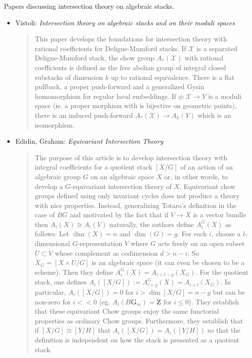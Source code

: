 \noindent
Papers discussing intersection theory on algebraic stacks.
\begin{itemize}
\item
Vistoli: \emph{Intersection theory on algebraic stacks and on their moduli
spaces} \cite{vistoli_intersection}
\begin{quote}
This paper develops the foundations for intersection theory with rational
coefficients for Deligne-Mumford stacks. If $\mathcal{X}$ is a separated
Deligne-Mumford stack, the chow group $A_*(\mathcal{X})$ with rational
coefficients is
defined as the free abelian group of integral closed substacks of dimension $k$
up to rational equivalence. There is a flat pullback, a proper push-forward
and a generalized Gysin homomorphism for regular local embeddings. If
$\phi : \mathcal{X} \to Y$ is a moduli space (ie. a proper morphism with
is bijective on
geometric points), there is an induced push-forward $A_*(\mathcal{X}) \to
A_k(Y)$
which is an isomorphism.
\end{quote}
\item Edidin, Graham: \emph{Equivariant Intersection Theory}
\cite{edidin-graham}
\begin{quote}
The purpose of this article is to develop intersection theory with integral
coefficients for a quotient stack $[X/G]$ of an action of an algebraic group
$G$ on an algebraic space $X$ or, in other words, to develop a $G$-equivariant
intersection theory of $X$. Equivariant chow groups defined using only
invariant cycles does not produce a theory with nice properties. Instead,
generalizing Totaro's definition in the case of $BG$ and motivated by the fact
that if $V \to X$ is a vector bundle then $A_i(X) \cong A_i(V)$ naturally, the
authors define $A_i^G(X)$ as follows:
Let $\dim(X) = n$ and $\dim(G) = g$. For each $i$, choose a $l$-dimensional
$G$-representation $V$ where $G$ acts freely on an open subset $U \subset V$
whose complement as codimension $d > n-i$. So $X_G= [X \times U / G]$ is an
algebraic space (it can even be chosen to be a scheme). Then they define
$A_i^G(X) = A_{i+l-g}(X_G)$. For the quotient stack, one defines $A_i( [X/G])
:= A_{i+g}^G(X) = A_{i+l}(X_G)$. In particular, $A_i([X/G]) = 0$ for $i > \dim
[X/G] = n - g$ but can be non-zero for $i << 0$ (eg. $A_i(B \mathbf{G}_m) =
\mathbf{Z}$ for
$i \le 0$).
They establish that these equivariant Chow groups enjoy the same functorial
properties as ordinary Chow groups. Furthermore, they establish that if $[X /
G] \cong [Y / H]$ that $A_i([X/G]) = A_i([Y/H])$ so that the definition is
independent on how the stack is presented as a quotient stack.

\end{quote}
\end{itemize}
